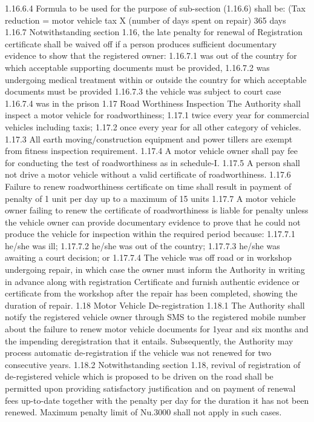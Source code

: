 \documentclass[
]{book}
\begin{document}
\begin{enumerate}
  1.16.6.4 Formula to be used for the purpose of sub-section (1.16.6) shall be:
  (Tax reduction = motor vehicle tax X (number of days spent on repair)
  365 days\\
  1.16.7 Notwithstanding section 1.16, the late penalty for renewal of Registration certificate shall be waived off if a person produces sufficient documentary evidence to show that the registered owner:
  1.16.7.1 was out of the country for which acceptable supporting documents must be provided,
  1.16.7.2 was undergoing medical treatment within or outside the country for which acceptable documents must be provided
  1.16.7.3 the vehicle was subject to court case
  1.16.7.4 was in the prison
  1.17 Road Worthiness Inspection
  The Authority shall inspect a motor vehicle for roadworthiness;
  1.17.1 twice every year for commercial vehicles including taxis;
  1.17.2 once every year for all other category of vehicles.
  1.17.3 All earth moving/construction equipment and power tillers are exempt from fitness inspection requirement.
  1.17.4 A motor vehicle owner shall pay fee for conducting the test of roadworthiness as in schedule-I.
  1.17.5 A person shall not drive a motor vehicle without a valid certificate of roadworthiness.
  1.17.6 Failure to renew roadworthiness certificate on time shall result in payment of penalty of 1 unit per day up to a maximum of 15 units
  1.17.7 A motor vehicle owner failing to renew the certificate of roadworthiness is liable for penalty unless the vehicle owner can provide documentary evidence to prove that he could not produce the vehicle for inspection within the required period because:
  1.17.7.1 he/she was ill;
  1.17.7.2 he/she was out of the country;
  1.17.7.3 he/she was awaiting a court decision; or
  1.17.7.4 The vehicle was off road or in workshop undergoing repair, in which case the owner must inform the Authority in writing in advance along with registration Certificate and furnish authentic evidence or certificate from the workshop after the repair has been completed, showing the duration of repair.
  1.18 Motor Vehicle De-registration
  1.18.1 The Authority shall notify the registered vehicle owner through SMS to the registered mobile number about the failure to renew motor vehicle documents for 1year and six months and the impending deregistration that it entails. Subsequently, the Authority may process automatic de-registration if the vehicle was not renewed for two consecutive years.
  1.18.2 Notwithstanding section 1.18, revival of registration of de-registered vehicle which is proposed to be driven on the road shall be permitted upon providing satisfactory justification and on payment of renewal fees up-to-date together with the penalty \citet{Nu.10} per day for the duration it has not been renewed. Maximum penalty limit of Nu.3000 shall not apply in such cases.

\end{enumerate}
\end{document}
